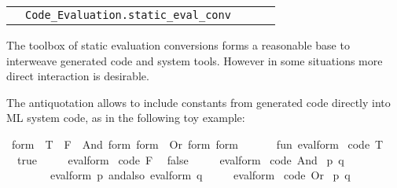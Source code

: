 \begin{isabellebody}
\begin{isamarkuptext}
\begin{tabular}{ll||c|c|c}
      & \ttsize\verb|Code_Evaluation.static_eval_conv|
  \end{tabular}%
\end{isamarkuptext}%
\isamarkuptrue%
%
\isamarkuptrue%
%
\begin{isamarkuptext}%
The toolbox of static evaluation conversions forms a reasonable base
  to interweave generated code and system tools.  However in some
  situations more direct interaction is desirable.%
\end{isamarkuptext}%
\isamarkuptrue%
%
\isamarkuptrue%
%
\begin{isamarkuptext}%
The  antiquotation allows to include constants from
  generated code directly into ML system code, as in the following toy
  example:%
\end{isamarkuptext}%
\isamarkuptrue%
%
\isadelimquote
%
\endisadelimquote
%
\isatagquote
{}\isamarkupfalse%
\ form\ {}\ T\ {}\ F\ {}\ And\ form\ form\ {}\ Or\ form\ form\ %
\endisatagquote
{\isafoldquote}%
%
\isadelimquote
%
\endisadelimquote
%
\isadelimquotett
\ %
\endisadelimquotett
%
\isatagquotett
{}\isamarkupfalse%
\ {}\isanewline
\ \ fun\ eval{}form\ %
\isaantiq
code\ T{}%
\endisaantiq
\ {}\ true\isanewline
\ \ \ \ {}\ eval{}form\ %
\isaantiq
code\ F{}%
\endisaantiq
\ {}\ false\isanewline
\ \ \ \ {}\ eval{}form\ {}%
\isaantiq
code\ And{}%
\endisaantiq
\ {}p{}\ q{}{}\ {}\isanewline
\ \ \ \ \ \ \ \ eval{}form\ p\ andalso\ eval{}form\ q\isanewline
\ \ \ \ {}\ eval{}form\ {}%
\isaantiq
code\ Or{}%
\endisaantiq
\ {}p{}\ q{}{}\ {}\isanewline

\end{isabellebody}
